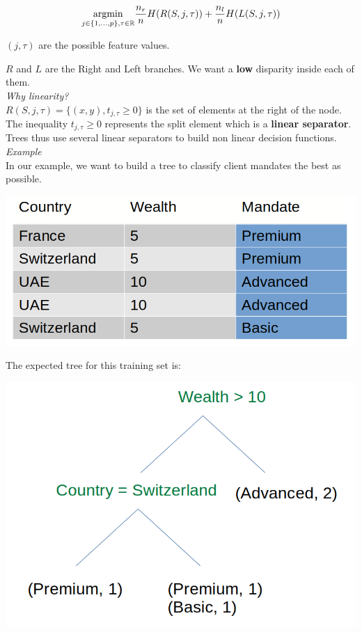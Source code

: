 $$\underset{j \in \{1,...,p\}, \\
\tau \in \mathbb{R}}{\operatorname{argmin}} \frac{n_r}{n}H(R(S,j,\tau))+\frac{n_l}{n}H(L(S,j,\tau))$$

$(j, \tau)$ are the possible feature values. 

$R$ and $L$ are the Right and Left branches. We want a \textbf{low} disparity inside each of them. \\

\textit{Why linearity?} \\

$R(S,j,\tau)=\{(x,y), t_{j,\tau} \ge 0\}$ is the set of elements at the right of the node. The inequality $t_{j,\tau} \ge 0$ represents the split element which is a \textbf{linear separator}. Trees thus use several linear separators to build non linear decision functions. \\

\textit{Example} \\

In our example, we want to build a tree to classify client mandates the best as possible.

\includegraphics[scale=0.2]{trees_data.png}

The expected tree for this training set is:

\begin{center}
\includegraphics[scale=0.2]{trees_example.png}
\end{center}

